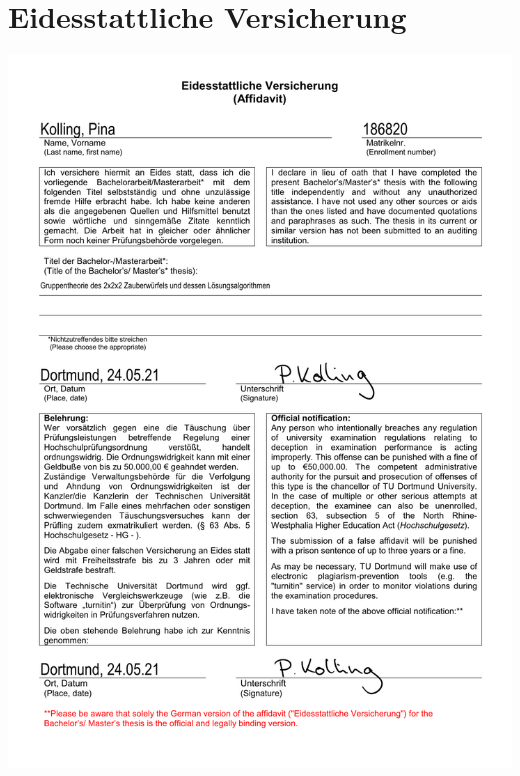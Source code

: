 \documentclass[12pt,a4paper, usenames, dvipsnames]{article}
\theoremstyle{mystyle}
\theoremstyle{definition}
\begin{document}
\section{Eidesstattliche Versicherung} %
\vspace*{-3em}
\begin{center}
\includegraphics[scale=0.8]{Eidesstattliche_Versicherung_2.pdf}
\end{center}










%
%
%
%
%
%
%
%
%
%
%
%
%
%
%
%
%
%
\end{document}
